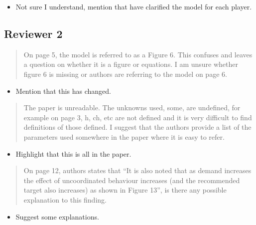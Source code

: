 \documentclass{article}
\begin{document}
\begin{itemize}
    \item Not sure I understand, mention that have clarified the model for each player.
\end{itemize}

\subsection{Reviewer 2}

\begin{quote}
    \begin{textit}{
    On page 5, the model is referred to as a Figure 6. This confuses and leaves a question on whether it is a figure or equations. I am unsure whether figure 6 is missing or authors are referring to the model on page 6.
    }\end{textit}
\end{quote}

\begin{itemize}
    \item Mention that this has changed.
\end{itemize}

\begin{quote}
    \begin{textit}{
The paper is unreadable. The unknowns used, some, are undefined, for example on page 3, h, ch, etc are not defined and it is very difficult to find definitions of those defined. I suggest that the authors provide a list of the parameters used somewhere in the paper where it is easy to refer.
    }\end{textit}
\end{quote}

\begin{itemize}
    \item Highlight that this is all in the paper.
\end{itemize}

\begin{quote}
    \begin{textit}{
    On page 12, authors states that ``It is also noted that as demand increases the effect of uncoordinated behaviour increases (and the recommended target also increases) as shown in Figure 13'', is there any possible explanation to this finding.
    }\end{textit}
\end{quote}

\begin{itemize}
    \item Suggest some explanations.
\end{itemize}
\end{document}
